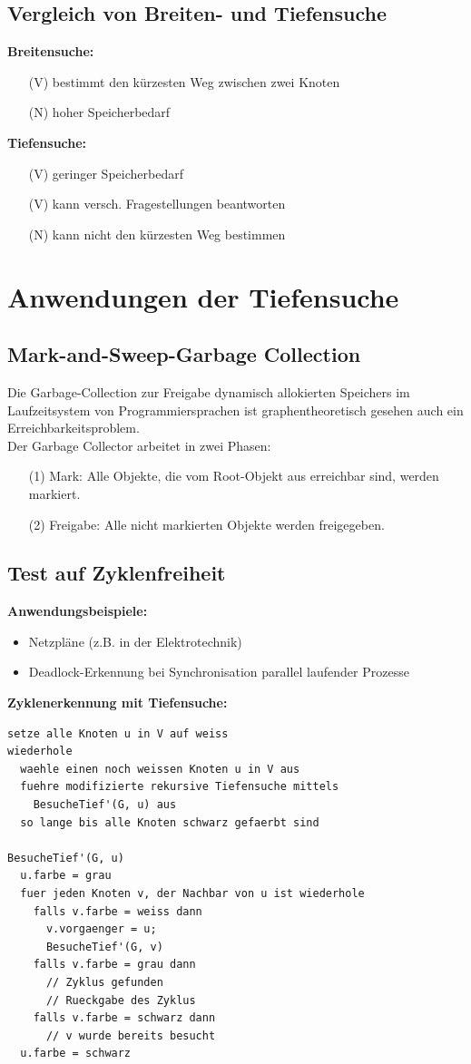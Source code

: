 \documentclass{scrreprt}
\begin{document}
\subsection{Vergleich von Breiten- und Tiefensuche}
\textbf{Breitensuche:}
\begin{itemize}
  \item [(V)] bestimmt den kürzesten Weg zwischen zwei Knoten
  \item [(N)] hoher Speicherbedarf
\end{itemize}
\textbf{Tiefensuche:}
\begin{itemize}
  \item [(V)] geringer Speicherbedarf
  \item [(V)] kann versch. Fragestellungen beantworten
  \item [(N)] kann nicht den kürzesten Weg bestimmen
\end{itemize}
\section{Anwendungen der Tiefensuche}
\subsection{Mark-and-Sweep-Garbage Collection}
Die Garbage-Collection zur Freigabe dynamisch allokierten Speichers im Laufzeitsystem von Programmiersprachen
ist graphentheoretisch gesehen auch ein Erreichbarkeitsproblem.
\\Der Garbage Collector arbeitet in zwei Phasen:
\begin{itemize}
  \item [(1)] Mark: Alle Objekte, die vom Root-Objekt aus erreichbar sind, werden markiert.
  \item [(2)] Freigabe: Alle nicht markierten Objekte werden freigegeben.
\end{itemize}
\subsection{Test auf Zyklenfreiheit}
\textbf{Anwendungsbeispiele:}
\begin{itemize}
  \item Netzpläne (z.B. in der Elektrotechnik)
  \item Deadlock-Erkennung bei Synchronisation parallel laufender Prozesse
\end{itemize}
\textbf{Zyklenerkennung mit Tiefensuche:}
\begin{lstlisting}
setze alle Knoten u in V auf weiss
wiederhole
  waehle einen noch weissen Knoten u in V aus
  fuehre modifizierte rekursive Tiefensuche mittels
    BesucheTief'(G, u) aus
  so lange bis alle Knoten schwarz gefaerbt sind

BesucheTief'(G, u)
  u.farbe = grau
  fuer jeden Knoten v, der Nachbar von u ist wiederhole
    falls v.farbe = weiss dann
      v.vorgaenger = u;
      BesucheTief'(G, v)
    falls v.farbe = grau dann
      // Zyklus gefunden
      // Rueckgabe des Zyklus
    falls v.farbe = schwarz dann
      // v wurde bereits besucht
  u.farbe = schwarz
\end{lstlisting}
\end{document}
